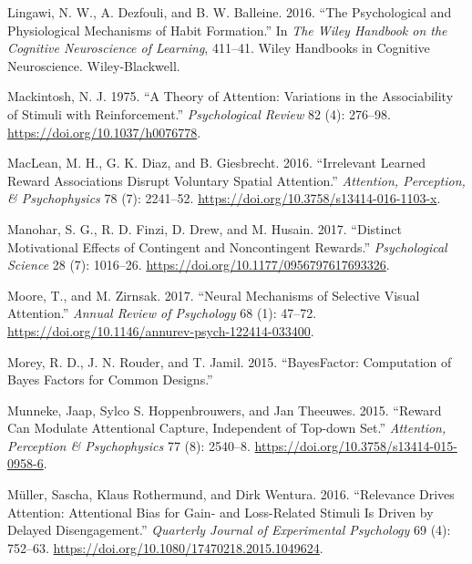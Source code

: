 \documentclass[11pt,halfline,a4paper,]{ouparticle}
\newlength{\cslhangindent}
\newenvironment{cslreferences}%
  {\setlength{\parindent}{0pt}%
  \everypar{\setlength{\hangindent}{\cslhangindent}}\ignorespaces}%
  {\par}
\begin{document}
\begin{cslreferences}
\leavevmode\hypertarget{ref-lingawiPsychologicalPhysiologicalMechanisms2016}{}%
Lingawi, N. W., A. Dezfouli, and B. W. Balleine. 2016. ``The Psychological and Physiological Mechanisms of Habit Formation.'' In \emph{The Wiley Handbook on the Cognitive Neuroscience of Learning}, 411--41. Wiley Handbooks in Cognitive Neuroscience. Wiley-Blackwell.

\leavevmode\hypertarget{ref-mackintoshTheoryAttentionVariations1975}{}%
Mackintosh, N. J. 1975. ``A Theory of Attention: Variations in the Associability of Stimuli with Reinforcement.'' \emph{Psychological Review} 82 (4): 276--98. \url{https://doi.org/10.1037/h0076778}.

\leavevmode\hypertarget{ref-macleanIrrelevantLearnedReward2016}{}%
MacLean, M. H., G. K. Diaz, and B. Giesbrecht. 2016. ``Irrelevant Learned Reward Associations Disrupt Voluntary Spatial Attention.'' \emph{Attention, Perception, \& Psychophysics} 78 (7): 2241--52. \url{https://doi.org/10.3758/s13414-016-1103-x}.

\leavevmode\hypertarget{ref-manoharDistinctMotivationalEffects2017}{}%
Manohar, S. G., R. D. Finzi, D. Drew, and M. Husain. 2017. ``Distinct Motivational Effects of Contingent and Noncontingent Rewards.'' \emph{Psychological Science} 28 (7): 1016--26. \url{https://doi.org/10.1177/0956797617693326}.

\leavevmode\hypertarget{ref-mooreNeuralMechanismsSelective2017}{}%
Moore, T., and M. Zirnsak. 2017. ``Neural Mechanisms of Selective Visual Attention.'' \emph{Annual Review of Psychology} 68 (1): 47--72. \url{https://doi.org/10.1146/annurev-psych-122414-033400}.

\leavevmode\hypertarget{ref-moreyBayesFactorComputationBayes2015}{}%
Morey, R. D., J. N. Rouder, and T. Jamil. 2015. ``BayesFactor: Computation of Bayes Factors for Common Designs.''

\leavevmode\hypertarget{ref-munnekeRewardCanModulate2015}{}%
Munneke, Jaap, Sylco S. Hoppenbrouwers, and Jan Theeuwes. 2015. ``Reward Can Modulate Attentional Capture, Independent of Top-down Set.'' \emph{Attention, Perception \& Psychophysics} 77 (8): 2540--8. \url{https://doi.org/10.3758/s13414-015-0958-6}.

\leavevmode\hypertarget{ref-mullerRelevanceDrivesAttention2016}{}%
Müller, Sascha, Klaus Rothermund, and Dirk Wentura. 2016. ``Relevance Drives Attention: Attentional Bias for Gain- and Loss-Related Stimuli Is Driven by Delayed Disengagement.'' \emph{Quarterly Journal of Experimental Psychology} 69 (4): 752--63. \url{https://doi.org/10.1080/17470218.2015.1049624}.


\end{cslreferences}
\end{document}
